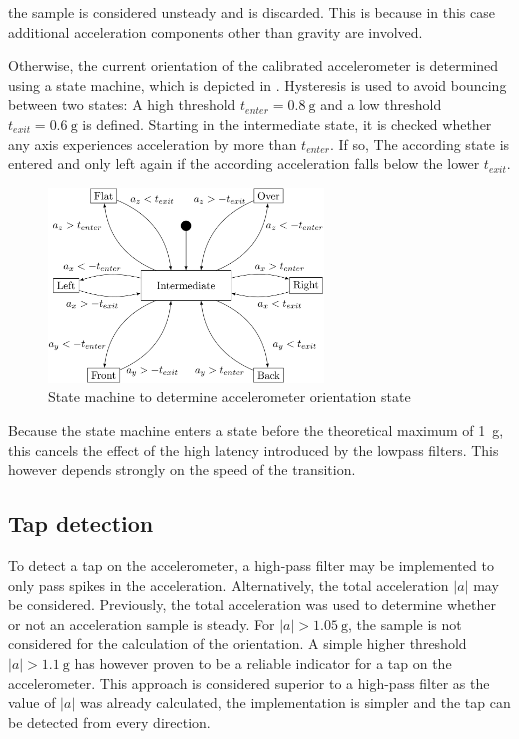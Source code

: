 \documentclass[a4paper, 12pt]{article}
\begin{document}
the sample is considered unsteady and is discarded. This is because in this case additional acceleration components other than gravity are involved.

Otherwise, the current orientation of the calibrated accelerometer is determined using a state machine, which is depicted in . Hysteresis is used to avoid bouncing between two states: A high threshold $t_{enter} = \SI{0.8}{\gram}$ and a low threshold $t_{exit} = \SI{0.6}{\gram}$ is defined. Starting in the intermediate state, it is checked whether any axis experiences acceleration by more than $t_{enter}$. If so, The according state is entered and only left again if the according acceleration falls below the lower $t_{exit}$.

\begin{figure}[h!]
	\centering
	\includegraphics[width=0.65\textwidth]{accel_stm.png}
	\caption{State machine to determine accelerometer orientation state}
	\label{fig:accel-stm}
\end{figure}

Because the state machine enters a state before the theoretical maximum of \SI{1}{\gram}, this cancels the effect of the high latency introduced by the lowpass filters. This however depends strongly on the speed of the transition.

\subsection{Tap detection}
To detect a tap on the accelerometer, a high-pass filter may be implemented to only pass spikes in the acceleration. Alternatively, the total acceleration $|a|$ may be considered. Previously, the total acceleration was used to determine whether or not an acceleration sample is steady. For $|a| > \SI{1.05}{\gram}$, the sample is not considered for the calculation of the orientation. A simple higher threshold $|a| > \SI{1.1}{\gram}$ has however proven to be a reliable indicator for a tap on the accelerometer. This approach is considered superior to a high-pass filter as the value of $|a|$ was already calculated, the implementation is simpler and the tap can be detected from every direction.
\end{document}
